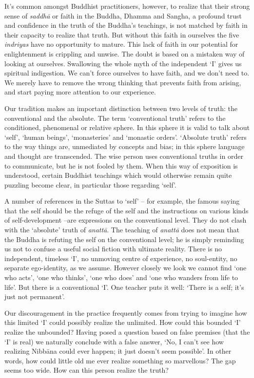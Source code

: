 It's common amongst Buddhist practitioners, however, to realize that
their strong sense of \emph{saddhā} or faith in the Buddha, Dhamma and
Sangha, a profound trust and confidence in the truth of the Buddha's
teachings, is not matched by faith in their capacity to realize that
truth. But without this faith in ourselves the five \emph{indriyas} have
no opportunity to mature. This lack of faith in our potential for
enlightenment is crippling and unwise. The doubt is based on a mistaken
way of looking at ourselves. Swallowing the whole myth of the
independent `I' gives us spiritual indigestion. We can't force ourselves
to have faith, and we don't need to. We merely have to remove the wrong
thinking that prevents faith from arising, and start paying more
attention to our experience.

Our tradition makes an important distinction between two levels of
truth: the conventional and the absolute. The term `conventional truth'
refers to the conditioned, phenomenal or relative sphere. In this sphere
it is valid to talk about `self', `human beings', `monasteries' and
`monastic orders'. `Absolute truth' refers to the way things are,
unmediated by concepts and bias; in this sphere language and thought are
transcended. The wise person uses conventional truths in order to
communicate, but he is not fooled by them. When this way of exposition
is understood, certain Buddhist teachings which would otherwise remain
quite puzzling become clear, in particular those regarding `self'.

A number of references in the Suttas to `self' -- for example, the
famous saying that the self should be the refuge of the self and the
instructions on various kinds of self-development --are expressions on
the conventional level. They do not clash with the `absolute' truth of
\emph{anattā}. The teaching of \emph{anattā} does not mean that the
Buddha is refuting the self on the conventional level; he is simply
reminding us not to confuse a useful social fiction with ultimate
reality. There is no independent, timeless `I', no unmoving centre of
experience, no soul-entity, no separate ego-identity, as we assume.
However closely we look we cannot find `one who acts', `one who thinks',
`one who does' and `one who wanders from life to life'. But there is a
conventional `I'. One teacher puts it well: `There is a self; it's just
not permanent'.

Our discouragement in the practice frequently comes from trying to
imagine how this limited `I' could possibly realize the unlimited. How
could this bounded `I' realize the unbounded? Having posed a question
based on false premises (that the `I' is real) we naturally conclude
with a false answer, `No, I can't see how realizing Nibbāna could ever
happen; it just doesn't seem possible'. In other words, how could little
old me ever realize something so marvellous? The gap seems too wide. How
can this person realize the truth?

